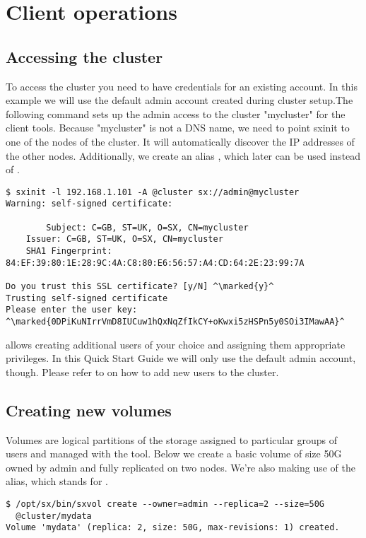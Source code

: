 \chapter{Client operations}

\section*{Accessing the cluster}
To access the cluster you need to have credentials for an existing
account. In this example we will use the default admin account created
during cluster setup.The following command sets up the admin access to
the \SX cluster "mycluster" for the client tools. Because "mycluster"
is not a DNS name, we need to point sxinit to one of the nodes of the
cluster. It will automatically discover the IP addresses of the other
nodes. Additionally, we create an alias , which later
can be used instead of .
\begin{lstlisting}
$ sxinit -l 192.168.1.101 -A @cluster sx://admin@mycluster
Warning: self-signed certificate:

        Subject: C=GB, ST=UK, O=SX, CN=mycluster
	Issuer: C=GB, ST=UK, O=SX, CN=mycluster
	SHA1 Fingerprint: 84:EF:39:80:1E:28:9C:4A:C8:80:E6:56:57:A4:CD:64:2E:23:99:7A

Do you trust this SSL certificate? [y/N] ^\marked{y}^
Trusting self-signed certificate
Please enter the user key:
^\marked{0DPiKuNIrrVmD8IUCuw1hQxNqZfIkCY+oKwxi5zHSPn5y0SOi3IMawAA}^
\end{lstlisting}

\SX allows creating additional users of your choice and assigning them
appropriate privileges. In this Quick Start Guide we will only use the
default admin account, though. Please refer to 
on how to add new users to the cluster.

\section*{Creating new volumes}
Volumes are logical partitions of the \SX storage assigned to particular
groups of users and managed with the  tool. Below we create
a basic volume of size 50G owned by admin and fully replicated on two nodes.
We're also making use of the  alias, which stands for .
\begin{lstlisting}
$ /opt/sx/bin/sxvol create --owner=admin --replica=2 --size=50G
  @cluster/mydata
Volume 'mydata' (replica: 2, size: 50G, max-revisions: 1) created.
\end{lstlisting}

